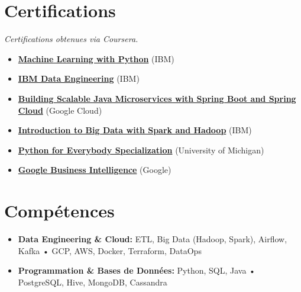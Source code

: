 \documentclass[11pt,a4paper,sans]{moderncv}
\begin{document}
  \section{\fontsize{11}\selectfont Certifications}
  \vspace{-5pt}
  \textit{Certifications obtenues via Coursera.}
  \begin{itemize}[leftmargin=0cm, itemsep=-2pt, topsep=0pt, partopsep=0pt, parsep=0pt, label={}]
      \item \textbf{\href{https://www.coursera.org/account/accomplishments/verify/G178XXP17WQA}{Machine Learning with Python}} (IBM)
      \item \textbf{\href{https://www.coursera.org/account/accomplishments/records/M5RKGX36BAVA}{IBM Data Engineering}} (IBM)
      \item \textbf{\href{https://google.com}{Building Scalable Java Microservices with Spring Boot and Spring Cloud}} (Google Cloud)
      \item \textbf{\href{https://www.coursera.org/account/accomplishments/verify/EK5SJM3YM7PX}{Introduction to Big Data with Spark and Hadoop}} (IBM)
      \item \textbf{\href{https://www.coursera.org/account/accomplishments/specialization/B4RCUAYCUG49}{Python for Everybody Specialization}} (University of Michigan)
      \item \textbf{\href{https://www.coursera.org/account/accomplishments/records/G867SJLRFQS2}{Google Business Intelligence}} (Google)
  \end{itemize}

  \vspace{-15pt}
  \section{\fontsize{11}\selectfont Compétences}
  \vspace{-6pt}
  \begin{itemize}[leftmargin=0cm, itemsep=-2pt, topsep=0pt, partopsep=0pt, parsep=0pt, label={}]
    \item \textbf{Data Engineering \& Cloud:} ETL, Big Data (Hadoop, Spark), Airflow, Kafka • GCP, AWS, Docker, Terraform, DataOps
    \item \textbf{Programmation \& Bases de Données:} Python, SQL, Java • PostgreSQL, Hive, MongoDB, Cassandra

  \end{itemize} 

 

  
\end{document}
